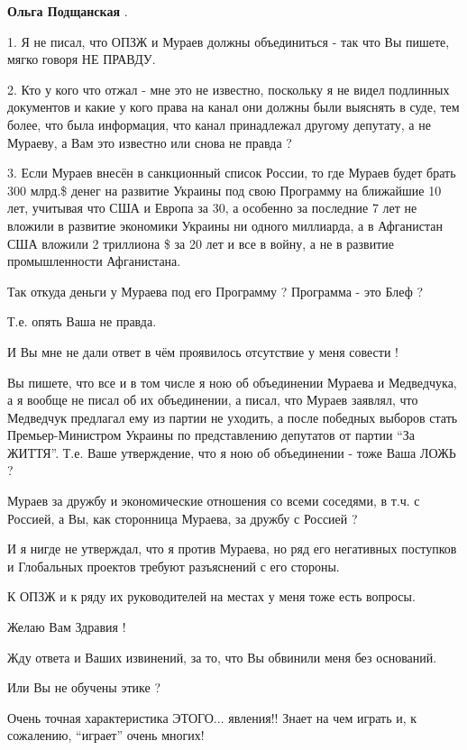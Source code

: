 \begin{itemize}
\begin{itemize}
\textbf{Ольга Подщанская} .

1. Я не писал, что ОПЗЖ и Мураев должны объединиться - так что Вы пишете, мягко
говоря НЕ ПРАВДУ.

2. Кто у кого что отжал - мне это не известно, поскольку я не видел подлинных
документов и какие у кого права на канал они должны были выяснять в суде, тем
более, что была информация, что канал принадлежал другому депутату, а не
Мураеву, а Вам это известно или снова не правда ?

3. Если Мураев внесён в санкционный список России, то где Мураев будет брать
300 млрд.\$ денег на развитие Украины под свою Программу на ближайшие 10 лет,
учитывая что США и Европа за 30, а особенно за последние 7 лет не вложили в
развитие экономики Украины ни одного миллиарда, а в Афганистан США вложили 2
триллиона \$ за 20 лет и все в войну, а не в развитие промышленности
Афганистана.

Так откуда деньги у Мураева под его Программу ? Программа - это Блеф ?

Т.е. опять Ваша не правда.

И Вы мне не дали ответ в чём проявилось отсутствие у меня совести !

Вы пишете, что все и в том числе я ною об объединении Мураева и Медведчука, а я
вообще не писал об их объединении, а писал, что Мураев заявлял, что Медведчук
предлагал ему из партии не уходить, а после победных выборов стать
Премьер-Министром Украины по представлению депутатов от партии \enquote{За ЖИТТЯ}. Т.е.
Ваше утверждение, что я ною об объединении - тоже Ваша ЛОЖЬ ?

Мураев за дружбу и экономические отношения со всеми соседями, в т.ч. с Россией,
а Вы, как сторонница Мураева, за дружбу с Россией ?

И я нигде не утверждал, что я против Мураева, но ряд его негативных поступков и
Глобальных проектов требуют разъяснений с его стороны.

К ОПЗЖ и к ряду их руководителей на местах у меня тоже есть вопросы.

Желаю Вам Здравия !

Жду ответа и Ваших извинений, за то, что Вы обвинили меня без оснований.

Или Вы не обучены этике ?

\end{itemize} %


Очень точная характеристика ЭТОГО... явления!! Знает на чем играть и, к
сожалению, \enquote{играет} очень многих!


\end{itemize}
